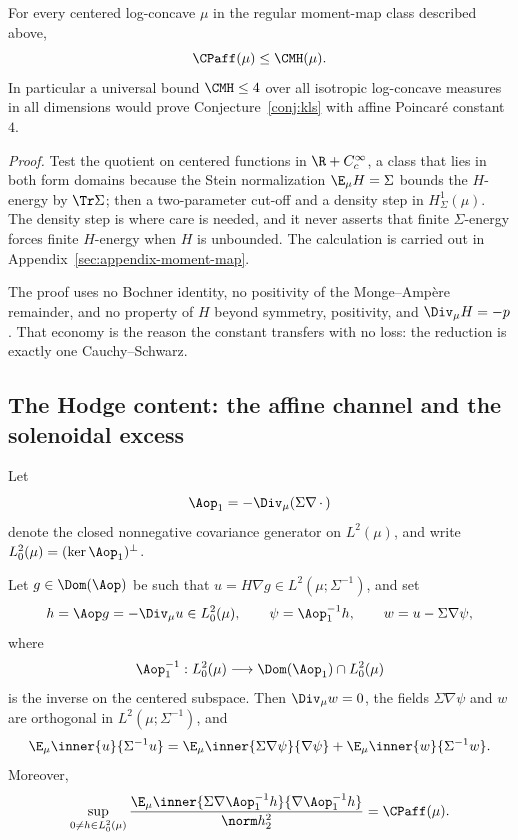 \documentclass[../../main.tex]{subfiles}
\begin{document}
\begin{theorem}
\label{thm:cmh-implies-affine-poincare}
For every centered log-concave $\mu$ in the regular moment-map class described above,
\begin{equation}
  \CPaff(\mu)\le\CMH(\mu).
  \label{eq:cmh-implies-poincare}
\end{equation}
In particular a universal bound $\CMH\le4$ over all isotropic log-concave measures in all
dimensions would prove Conjecture~\ref{conj:kls} with affine Poincar\'e constant $4$.
\end{theorem}

\noindent\emph{Proof.} Test the quotient on centered functions in $\R+C_c^\infty$, a class that lies in both form domains because the Stein normalization $\E_\mu H=\Sigma$ bounds the $H$-energy by $\Tr\Sigma$; then a two-parameter cut-off and a density step in $H^1_\Sigma(\mu)$. The density step is where care is needed, and it never asserts that finite $\Sigma$-energy forces finite $H$-energy when $H$ is unbounded. The calculation is carried out in Appendix~\ref{sec:appendix-moment-map}.

The proof uses no Bochner identity, no positivity of the Monge--Amp\`ere remainder, and no
property of $H$ beyond symmetry, positivity, and $\Div_\mu H=-p$. That economy is the reason
the constant transfers with no loss: the reduction is exactly one Cauchy--Schwarz.

\subsection{The Hodge content: the affine channel and the solenoidal excess}
\label{subsec:cmh-hodge}

Let
\[
  \Aop_1=-\Div_\mu(\Sigma\nabla\,\cdot\,)
\]
denote the closed nonnegative covariance generator on $L^2(\mu)$, and write
$L^2_0(\mu)=(\ker\Aop_1)^\perp$.

\begin{proposition}
\label{prop:cmh-hodge}
Let $g\in\Dom(\Aop)$ be such that
$u=H\nabla g\in L^2(\mu;\Sigma^{-1})$, and set
\[
  h=\Aop g=-\Div_\mu u\in L^2_0(\mu),\qquad
  \psi=\Aop_1^{-1}h,\qquad
  w=u-\Sigma\nabla\psi,
\]
where
\[
  \Aop_1^{-1}:L^2_0(\mu)\longrightarrow
  \Dom(\Aop_1)\cap L^2_0(\mu)
\]
is the inverse on the centered subspace. Then $\Div_\mu w=0$, the fields
$\Sigma\nabla\psi$ and $w$ are orthogonal in $L^2(\mu;\Sigma^{-1})$, and
\begin{equation}
  \E_\mu\inner{u}{\Sigma^{-1}u}
  =\E_\mu\inner{\Sigma\nabla\psi}{\nabla\psi}
   +\E_\mu\inner{w}{\Sigma^{-1}w}.
  \label{eq:cmh-hodge}
\end{equation}
Moreover,
\[
  \sup_{0\ne h\in L^2_0(\mu)}
  \frac{\E_\mu\inner{\Sigma\nabla\Aop_1^{-1}h}
                         {\nabla\Aop_1^{-1}h}}
       {\norm h_2^2}
  =\CPaff(\mu).
\]
\end{proposition}
\end{document}
